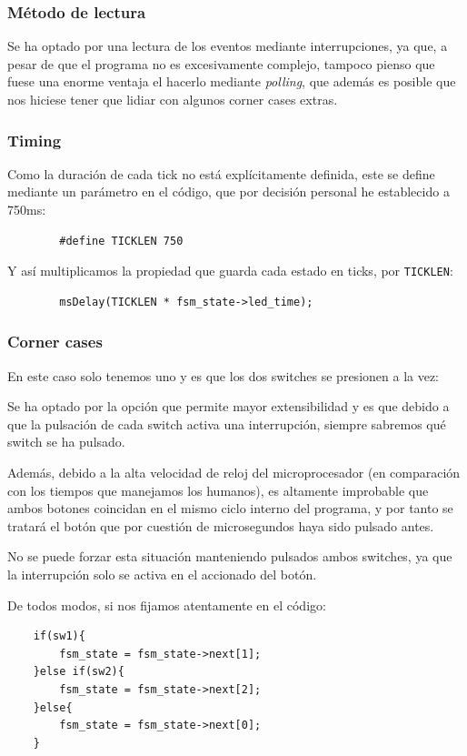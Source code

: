 \documentclass[a4paper,openright,12pt]{article}
\begin{document}
\subsubsection{Método de lectura}\label{reading_method}
Se ha optado por una lectura de los eventos mediante interrupciones, ya que, a pesar de que el programa no es excesivamente complejo, tampoco pienso que fuese una enorme ventaja el
hacerlo mediante \emph{polling}, que además es posible que nos hiciese tener que lidiar con algunos corner cases extras.

\subsubsection{Timing}\label{ticklen_duration}
Como la duración de cada tick no está explícitamente definida, este se define mediante un parámetro en el código, que por decisión personal
he establecido a 750ms:
\begin{verbatim}
        #define TICKLEN 750
\end{verbatim}

Y así multiplicamos la propiedad que guarda cada estado en ticks, por \texttt{TICKLEN}:
\begin{verbatim}
        msDelay(TICKLEN * fsm_state->led_time);
\end{verbatim}

\subsubsection{Corner cases}
En este caso solo tenemos uno y es que los dos switches se presionen a la vez:

Se ha optado por la opción que permite mayor extensibilidad y es que debido a que la pulsación de cada switch activa una interrupción,
siempre sabremos qué switch se ha pulsado.

Además, debido a la alta velocidad de reloj del microprocesador (en comparación con los tiempos que manejamos los humanos), es altamente improbable que ambos botones coincidan
en el mismo ciclo interno del programa, y por tanto se tratará el botón que por cuestión de microsegundos haya sido pulsado antes.

No se puede forzar esta situación manteniendo pulsados ambos switches, ya que la interrupción solo se activa en el accionado del botón.

De todos modos, si nos fijamos atentamente en el código:

\begin{samepage}
\begin{verbatim}
    if(sw1){
        fsm_state = fsm_state->next[1];
    }else if(sw2){
        fsm_state = fsm_state->next[2];
    }else{
        fsm_state = fsm_state->next[0];
    }
\end{verbatim}    
\end{samepage}
\end{document}
